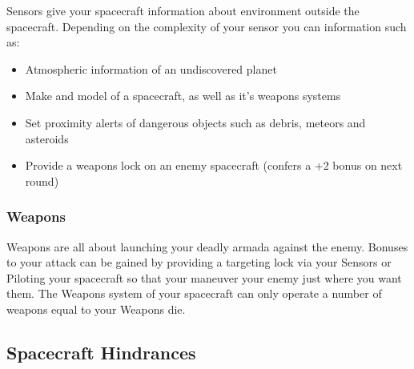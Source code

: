 \begin{multicols}{2}
Sensors give your spacecraft information about environment outside the spacecraft. Depending on the complexity of your sensor you can information such as:

\begin{itemize}
  \item Atmospheric information of an undiscovered planet
  \item Make and model of a spacecraft, as well as it's weapons systems
  \item Set proximity alerts of dangerous objects such as debris, meteors and asteroids
  \item Provide a weapons lock on an enemy spacecraft (confers a +2 bonus on next round)
\end{itemize}

\subsubsection{Weapons}

Weapons are all about launching your deadly armada against the enemy. Bonuses to your attack can be gained by providing a targeting lock via your Sensors or Piloting your spacecraft so that your maneuver your enemy just where you want them. The Weapons system of your spacecraft can only operate a number of weapons equal to your Weapons die.

\end{multicols}

\subsection{Spacecraft Hindrances}

